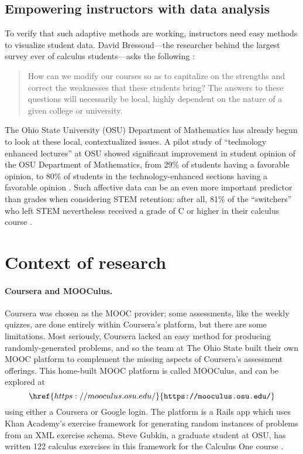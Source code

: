 \documentclass[12pt]{article}
\begin{document}
\subsection{Empowering instructors with data analysis}

To verify that such adaptive methods are working, instructors need
easy methods to visualize student data.  David Bressoud---the
researcher behind the largest survey ever of calculus students---asks
the following \parencite{bressoud-sky-falling}:
\begin{quote}
  How can we modify our courses so as to capitalize on the strengths
  and correct the weaknesses that these students bring?  The answers
  to these questions will necessarily be local, highly dependent on
  the nature of a given college or university.
\end{quote}
The Ohio State University (OSU) Department of Mathematics has already
begun to look at these local, contextualized issues.  A pilot study of
``technology enhanced lectures'' at OSU showed significant improvement
in student opinion of the OSU Department of Mathematics, from 29\% of
students having a favorable opinion, to 80\% of students in the
technology-enhanced sections having a favorable opinion
\cite{miller-tech-enhanced-calculus}.  Such affective data can be an
even more important predictor than grades when considering STEM
retention: after all, 81\% of the ``switchers'' who left STEM
nevertheless received a grade of C or higher in their calculus course
\cite{calculus-programs}.

\section{Context of research}

\paragraph{Coursera and MOOCulus.}
Coursera was chosen as the MOOC provider; some assessments, like the
weekly quizzes, are done entirely within Coursera's platform, but
there are some limitations.  Most seriously, Coursera lacked an easy
method for producing randomly-generated problems, and so the team at
The Ohio State built their own MOOC platform to complement the missing
aspects of Coursera's assessment offerings.  This home-built MOOC
platform is called MOOCulus, and can be explored at
\[
\href{https://mooculus.osu.edu/}{\texttt{https://mooculus.osu.edu/}}
\]
using either a Coursera or Google login.  The platform is a Rails app
which uses Khan Academy's exercise framework \parencite{khan-academy}
for generating random instances of problems from an XML exercise
schema.  Steve Gubkin, a graduate student at OSU, has written 122
calculus exercises in this framework for the Calculus One
course \parencite{steve-gubkin}.
\end{document}
